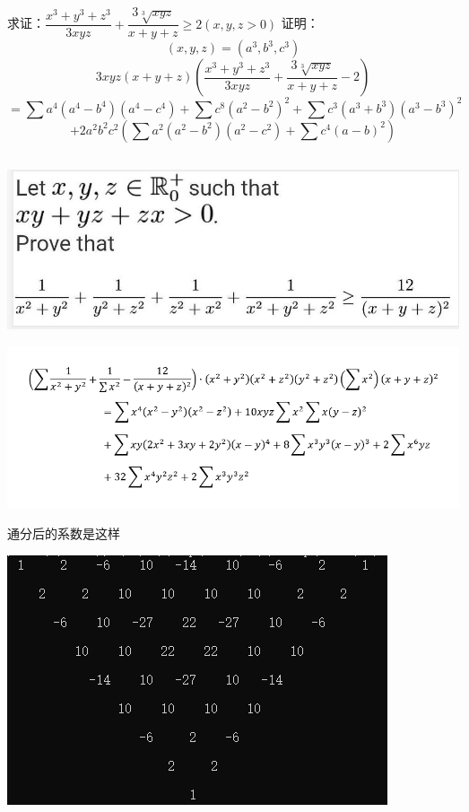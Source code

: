 \documentclass[UTF8]{ctexart}
\begin{document}
\subsection{}
求证：$ \displaystyle \dfrac{x^{3}+y^{3}+z^{3}}{3 x y z}+\displaystyle \dfrac{3 \sqrt[3]{x y z}}{x+y+z} \geq 2(x, y, z>0) $
证明：
$$ (x, y, z)=(a^{3}, b^{3}, c^{3}) $$
$$3 x y z(x+y+z)(\displaystyle \dfrac{x^{3}+y^{3}+z^{3}}{3 x y z}+\displaystyle \dfrac{3 \sqrt[3]{x y z}}{x+y+z}-2) $$
$$ =\displaystyle \sum a^{4}(a^{4}-b^{4})(a^{4}-c^{4})+\displaystyle \sum c^{8}(a^{2}-b^{2})^{2}+\displaystyle \sum c^{3}(a^{3}+b^{3})(a^{3}-b^{3})^{2} $$
$$ +2 a^{2} b^{2} c^{2}(\displaystyle \sum a^{2}(a^{2}-b^{2})(a^{2}-c^{2})+\displaystyle \sum c^{4}(a-b)^{2}) $$
\subsection{}
\begin{center}
	\includegraphics[width=0.6\linewidth]{a01}
\end{center}
\begin{center}
	\includegraphics[width=0.7\linewidth]{a02}
\end{center}
通分后的系数是这样
\begin{center}
	\includegraphics[width=0.7\linewidth]{a03}
\end{center}
\end{document}
